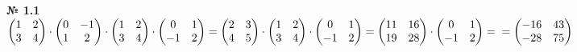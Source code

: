 \documentclass[a4paper, 12pt]{article}
\newenvironment{task}[1][0]{\vspace{.5cm} {\textbf{№ #1} \vspace{.5cm}\\ }}{}
\begin{document}
\begin{task}[1.1]
$
\begin{pmatrix}
	1 & 2\\
	3 & 4\\
\end{pmatrix} \cdot
\begin{pmatrix}
	0 & -1\\
	1 & 2\\
\end{pmatrix} \cdot
\begin{pmatrix}
	1 & 2\\
	3 & 4\\
\end{pmatrix} \cdot
\begin{pmatrix}
	0 & 1\\
	-1 & 2\\
\end{pmatrix}=
\begin{pmatrix}
	2 & 3\\
	4 & 5\\
\end{pmatrix} \cdot
\begin{pmatrix}
1 & 2\\
3 & 4\\
\end{pmatrix} \cdot
\begin{pmatrix}
0 & 1\\
-1 & 2\\
\end{pmatrix}=
\begin{pmatrix}
	11 & 16\\
	19 & 28\\
\end{pmatrix} \cdot
\begin{pmatrix}
	0 & 1\\
	-1 & 2\\
\end{pmatrix}=\\=
\begin{pmatrix}
	-16 & 43\\
	-28 & 75\\
\end{pmatrix}
$\\
\end{task}
\end{document}
